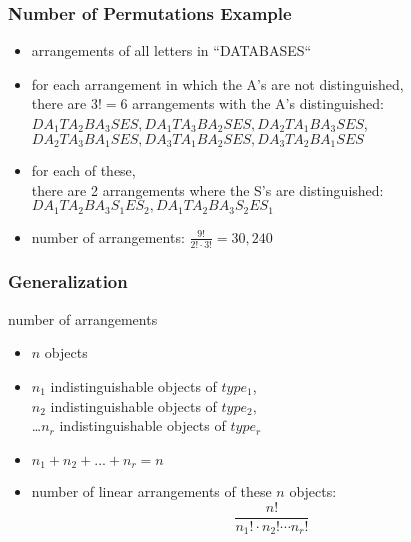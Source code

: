 \documentclass[dvipsnames]{beamer}
\begin{document}
\begin{frame}
  \frametitle{Number of Permutations Example}

  \begin{example}
    \begin{itemize}
      \item arrangements of all letters in ``DATABASES``

      \pause
      \medskip
      \item for each arrangement in which the A's are not distinguished,\\
        there are $3! = 6$ arrangements with the A's distinguished:\\
        $DA_{1}TA_{2}BA_{3}SES,DA_{1}TA_{3}BA_{2}SES, DA_{2}TA_{1}BA_{3}SES$,\\
        $DA_{2}TA_{3}BA_{1}SES, DA_{3}TA_{1}BA_{2}SES, DA_{3}TA_{2}BA_{1}SES$

      \pause
      \item for each of these,\\
        there are 2 arrangements where the S's are distinguished:\\
        $DA_{1}TA_{2}BA_{3}S_{1}ES_{2},DA_{1}TA_{2}BA_{3}S_{2}ES_{1}$

      \pause
      \medskip
      \item number of arrangements: $\frac{9!}{2! \cdot 3!} = 30,240$
   \end{itemize}
  \end{example}
\end{frame}

\begin{frame}
  \frametitle{Generalization}
  
  \begin{block}{number of arrangements}
    \begin{itemize}
      \item $n$ objects
      \item $n_1$ indistinguishable objects of $type_1$,\\
        $n_2$ indistinguishable objects of $type_2$,\\
        \ldots $n_r$ indistinguishable objects of $type_r$
      \item $n_1 + n_2 + ... + n_r = n$

      \medskip
      \item number of linear arrangements of these $n$ objects:
      \begin{equation*}
        \frac{n!}{n_1! \cdot n_2! \cdots n_r!}
      \end{equation*}
    \end{itemize}
  \end{block}
\end{frame}
\end{document}
